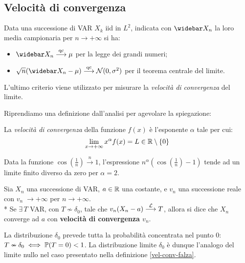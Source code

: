 \subsection{Velocità di convergenza}

Data una successione di VAR $X_k$ iid in $L^2$, indicata con $\widebar X_n$ la loro media campionaria per $n \to +\infty$ si ha:
\begin{itemize}
	\item $\widebar X_n \stackrel{\text{qc}}{\longrightarrow} \mu$ per la legge dei grandi numeri;
	\item $\sqrt{n}(\widebar X_n - \mu) \stackrel{\text{qc}}{\longrightarrow} \Nc(0, \sigma^2)$ per il teorema centrale del limite.
\end{itemize}
L'ultimo criterio viene utilizzato per misurare la \textit{velocità di convergenza} del limite.

Riprendiamo una definizione dall'analisi per agevolare la spiegazione:

\begin{defn}\label{vel-conv-falza}
  La \emph{velocità di convergenza} della funzione $f(x)$ è l'esponente $\alpha$ tale per cui: $$\lim\limits_{x \to +\infty} x^\alpha f(x) = L \in \mathbb R \setminus \{0\}$$
\end{defn}

\medskip
\begin{ese}
  Data la funzione $\cos\left(\frac 1 n\right) \stackrel{n}{\to} 1$, l'espressione $n^\alpha \left(\cos\left(\frac 1 n\right)-1\right)$ tende ad un limite finito diverso da zero per $\alpha = 2$.
\end{ese}

\medskip
\begin{defn}
  Sia $X_n$ una successione di VAR, $a \in \mathbb R$ una costante, e $v_n$ una successione reale con $v_n \; \to +\infty$ per $n \to +\infty$. \\*
  Se $\exists \, T$ VAR, con $ T \nsim \delta_0 $, tale che $v_n(X_n-a) \stackrel{\mathcal L}{\longrightarrow} T$, allora si dice che $X_n$ converge ad $a$ con \textbf{velocità di convergenza $v_n$}.
\end{defn}

\medskip
\begin{nb} La distribuzione $\delta_0$ prevede tutta la probabilità concentrata nel punto 0:
  $T \nsim \delta_0 \iff \mathbb P (T=0) < 1$. La distribuzione limite $\delta_0$ è dunque l'analogo del limite nullo nel caso presentato nella definizione \ref{vel-conv-falza}.
\end{nb}

